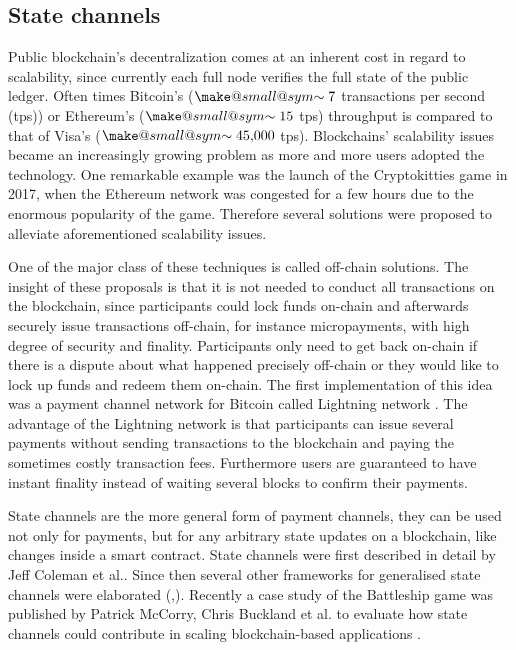 \documentclass[a4paper]{article}
\makeatletter
\theoremstyle{definition}
\newcommand{\smallsim}{\smallsym{\mathrel}{\sim}}
\newcommand{\smallsym}[2]{#1{\mathpalette\make@small@sym{#2}}}
\newcommand{\make@small@sym}[2]{%
	\vcenter{\hbox{$\m@th\downgrade@style#1#2$}}%
}
\newcommand{\downgrade@style}[1]{%
	\ifx#1\displaystyle\scriptstyle\else
	\ifx#1\textstyle\scriptstyle\else
	\scriptscriptstyle
	\fi\fi
}
\makeatother
\begin{document}
\subsection{State channels} 
Public blockchain's decentralization comes at an inherent cost in regard to scalability, since currently each full node verifies the full state of the public ledger. Often times Bitcoin's ($\smallsim7$ transactions per second (tps)) or Ethereum's ($\smallsim15$ tps) throughput is compared to that of Visa's ($\smallsim\num[group-separator={,}]{45000}$ tps). Blockchains' scalability issues became an increasingly growing problem as more and more users adopted the technology. One remarkable example was the launch of the Cryptokitties game in 2017, when the Ethereum network was congested for a few hours due to the enormous popularity of the game. Therefore several solutions were proposed to alleviate aforementioned scalability issues.

One of the major class of these techniques is called off-chain solutions. The insight of these proposals is that it is not needed to conduct all transactions on the blockchain, since participants could lock funds on-chain and afterwards securely issue transactions off-chain, for instance micropayments, with high degree of security and finality. Participants only need to get back on-chain if there is a dispute about what happened precisely off-chain or they would like to lock up funds and redeem them on-chain. The first implementation of this idea was a payment channel network for Bitcoin called Lightning network \cite{poon2016bitcoin}. The advantage of the Lightning network is that participants can issue several payments without sending transactions to the blockchain and paying the sometimes costly transaction fees. Furthermore users are guaranteed to have instant finality instead of waiting several blocks to confirm their payments. 

State channels are the more general form of payment channels, they can be used not only for payments, but for any arbitrary state updates on a blockchain, like changes inside a smart contract. State channels were first described in detail by Jeff Coleman et al.\cite{coleman2018counterfactual}. Since then several other frameworks for generalised state channels were elaborated (\cite{dziembowski2017perun},\cite{mccorryyou}). Recently a case study of the Battleship game was published by Patrick McCorry, Chris Buckland et al. to evaluate how state channels could contribute in scaling blockchain-based applications \cite{mccorryyou}.  
\end{document}

